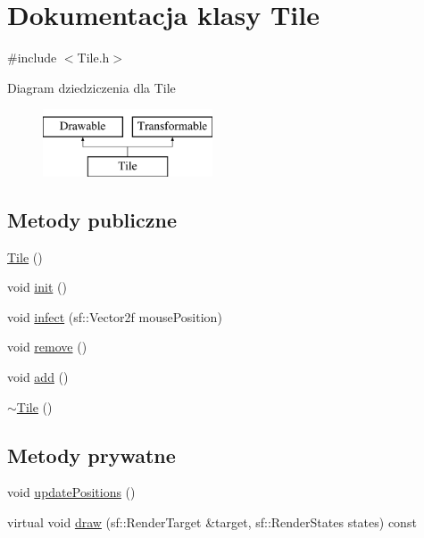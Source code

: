 \hypertarget{class_tile}{}\section{Dokumentacja klasy Tile}
\label{class_tile}


{\ttfamily \#include $<$Tile.\+h$>$}

Diagram dziedziczenia dla Tile\begin{figure}[H]
\begin{center}
\leavevmode
\includegraphics[height=2.000000cm]{df/d79/class_tile}
\end{center}
\end{figure}
\subsection*{Metody publiczne}
\begin{DoxyCompactItemize}
\item 
\mbox{\hyperlink{class_tile_aeeb5593bb6b75aae2edfcccbc84ab378}{Tile}} ()
\item 
void \mbox{\hyperlink{class_tile_a96ce55d5fcb4b12880531af2138ba6b2}{init}} ()
\item 
void \mbox{\hyperlink{class_tile_a8d009abca71750d7de775edea5910ab4}{infect}} (sf\+::\+Vector2f mouse\+Position)
\item 
void \mbox{\hyperlink{class_tile_a9f5897287ec33ef87fe88a2b254d1837}{remove}} ()
\item 
void \mbox{\hyperlink{class_tile_a89f236ddba83484658f4f68e117a786e}{add}} ()
\item 
\mbox{\hyperlink{class_tile_a98634abbd93fa13d0578d7103202d03d}{$\sim$\+Tile}} ()
\end{DoxyCompactItemize}
\subsection*{Metody prywatne}
\begin{DoxyCompactItemize}
\item 
void \mbox{\hyperlink{class_tile_a0d59a6e7e8b9c4236857470176edcf60}{update\+Positions}} ()
\item 
virtual void \mbox{\hyperlink{class_tile_acc7f60fb395569f318425129875336ca}{draw}} (sf\+::\+Render\+Target \&target, sf\+::\+Render\+States states) const
\end{DoxyCompactItemize}


